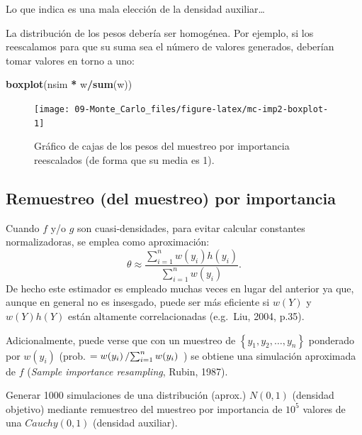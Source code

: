 \documentclass[
]{book}
\newenvironment{Shaded}{\begin{snugshade}}{\end{snugshade}}
\newcommand{\KeywordTok}[1]{\textcolor[rgb]{0.13,0.29,0.53}{\textbf{#1}}}
\newcommand{\NormalTok}[1]{#1}
\newcommand{\OperatorTok}[1]{\textcolor[rgb]{0.81,0.36,0.00}{\textbf{#1}}}
\newcommand{\StringTok}[1]{\textcolor[rgb]{0.31,0.60,0.02}{#1}}
\theoremstyle{break}
\theoremstyle{definition}
\theoremstyle{definition}
\theoremstyle{definition}
\theoremstyle{remark}
\let\BeginKnitrBlock\begin \let\EndKnitrBlock\end
\begin{document}
Lo que indica es una mala elección de la densidad auxiliar\ldots{}

La distribución de los pesos debería ser homogénea.
Por ejemplo, si los reescalamos para que su suma sea el número de valores generados, deberían tomar valores en torno a uno:

\begin{Shaded}
\begin{Highlighting}[]
\KeywordTok{boxplot}\NormalTok{(nsim }\OperatorTok{*}\StringTok{ }\NormalTok{w}\OperatorTok{/}\KeywordTok{sum}\NormalTok{(w))  }
\end{Highlighting}
\end{Shaded}

\begin{figure}[!htb]

{\centering \texttt{[image: 09-Monte\_Carlo\_files/figure-latex/mc-imp2-boxplot-1]} 

}

\caption{Gráfico de cajas de los pesos del muestreo por importancia reescalados (de forma que su media es 1).}\label{fig:mc-imp2-boxplot}
\end{figure}

\hypertarget{remuestreo-del-muestreo-por-importancia}{%
\subsection{Remuestreo (del muestreo) por importancia}\label{remuestreo-del-muestreo-por-importancia}}

Cuando \(f\) y/o \(g\) son cuasi-densidades, para evitar calcular constantes normalizadoras, se emplea como aproximación:
\[\theta \approx \frac{\sum\limits_{i=1}^n w(y_i) h\left( y_i\right) }{ \sum\limits_{i=1}^n w(y_i)}.\]
De hecho este estimador es empleado muchas veces en lugar del anterior ya que, aunque en general no es insesgado, puede ser más eficiente si \(w(Y)\) y \(w(Y)h(Y)\) están altamente correlacionadas (e.g.~Liu, 2004, p.35).

Adicionalmente, puede verse que con un muestreo de \(\left\{y_1, y_2, \ldots, y_n \right\}\) ponderado por \(w(y_i)\) (prob. \(=w(y_i)\left/ \sum\nolimits_{i=1}^n w(y_i) \right.\) ) se obtiene una simulación aproximada de \(f\) (\emph{Sample importance resampling}, Rubin, 1987).

\BeginKnitrBlock{exercise}
\protect\hypertarget{exr:mc-imp-sample}{}{\label{exr:mc-imp-sample} }
\EndKnitrBlock{exercise}

Generar 1000 simulaciones de una distribución (aprox.) \(N(0,1)\) (densidad objetivo) mediante remuestreo del muestreo por importancia de \(10^{5}\) valores de una \(Cauchy(0,1)\) (densidad auxiliar).
\end{document}
